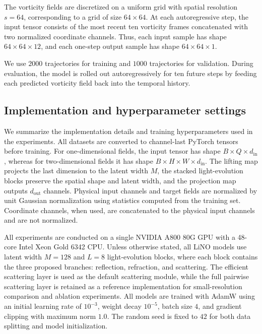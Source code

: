 \documentclass{article}
\begin{document}
The vorticity fields are discretized on a uniform grid with spatial resolution $s = 64$,
corresponding to a grid of size $64\times64$. 
At each autoregressive step, the input tensor consists of the most recent ten vorticity frames concatenated with two normalized coordinate channels.
Thus, each input sample has shape $64\times64\times12$, and each one-step output sample has shape $64\times64\times1$.

We use $2000$ trajectories for training and $1000$ trajectories for validation. 
During evaluation, the model is rolled out autoregressively for ten future steps by feeding each predicted vorticity field back into the temporal history.


\subsection{Implementation and hyperparameter settings}
\label{app:implementation-settings}

We summarize the implementation details and training hyperparameters used in the experiments. 
All datasets are converted to channel-last PyTorch tensors before training. For one-dimensional fields, the input tensor has shape $B\times Q\times d_{\mathrm{in}}$, whereas for two-dimensional fields it has shape $B\times H\times W\times d_{\mathrm{in}}$. The lifting map projects the last dimension to the latent width $M$, the stacked light-evolution blocks preserve the spatial shape and latent width, and the projection map outputs $d_{\mathrm{out}}$ channels. Physical input channels and target fields are normalized by unit Gaussian normalization using statistics computed from the training set. Coordinate channels, when used, are concatenated to the physical input channels and are not normalized.

All experiments are conducted on a single NVIDIA A800 80G GPU with a 48-core Intel Xeon Gold 6342 CPU. 
Unless otherwise stated, all LiNO models use latent width $M=128$ and $L=8$ light-evolution blocks, where each block contains the three proposed branches: reflection, refraction, and scattering. The efficient scattering layer is used as the default scattering module, while the full pairwise scattering layer is retained as a reference implementation for small-resolution comparison and ablation experiments. All models are trained with AdamW using an initial learning rate of $10^{-3}$, weight decay $10^{-5}$, batch size $4$, and gradient clipping with maximum norm $1.0$. The random seed is fixed to $42$ for both data splitting and model initialization.
\end{document}
